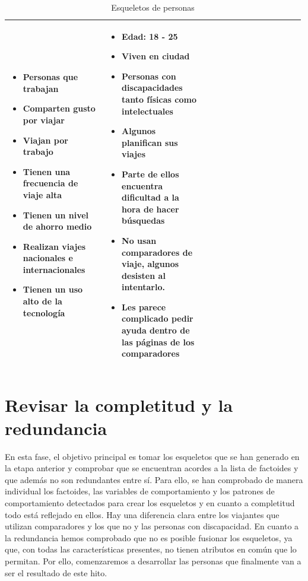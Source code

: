 \begin{table}[h]
\begin{tabular}{|p{0.33\linewidth}|p{0.33\linewidth}|p{0.33\linewidth}|}
\begin{itemize}
            \item Personas que trabajan
            \item Comparten gusto por viajar
            \item Viajan por trabajo
            \item Tienen una frecuencia de viaje alta
            \item Tienen un nivel de ahorro medio
            \item Realizan viajes nacionales e internacionales
            \item Tienen un uso alto de la tecnología                       
        \end{itemize}
        &
        \begin{itemize}
            \item Edad: 18 - 25
            \item Viven en ciudad
            \item Personas con discapacidades tanto físicas como intelectuales
            \item Algunos planifican sus viajes
            \item Parte de ellos encuentra dificultad a la hora de hacer búsquedas
            \item No usan comparadores de viaje, algunos desisten al intentarlo.
            \item Les parece complicado pedir ayuda dentro de las páginas de los comparadores                      
        \end{itemize}
        \\ \hline
    \end{tabular}
    \caption{Esqueletos de personas}
    \label{table:esqueletos-personas}
\end{table}

\section{Revisar la completitud y la redundancia}
En esta fase, el objetivo principal es tomar los esqueletos que se han generado en la etapa anterior y comprobar que se encuentran acordes a la lista de factoides y que además no son redundantes entre sí. Para ello, se han comprobado de manera individual los factoides, las variables de comportamiento y los patrones de comportamiento detectados para crear los esqueletos y en cuanto a completitud todo está reflejado en ellos. 
Hay una diferencia clara entre los viajantes que utilizan comparadores y los que no y las personas con discapacidad. 
En cuanto a la redundancia hemos comprobado que no es posible fusionar los esqueletos, ya que, con todas las características presentes, no tienen atributos en común que lo permitan. Por ello, comenzaremos a desarrollar las personas que finalmente van a ser el resultado de este hito.

